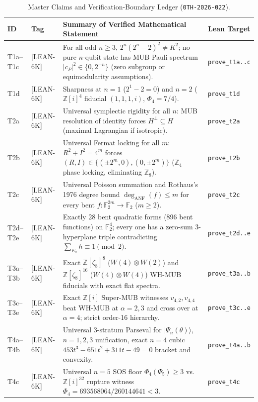 \documentclass[11pt,reqno]{amsart}
\theoremstyle{definition}
\newcommand{\F}{\mathbb{F}}
\newcommand{\Z}{\mathbb{Z}}
\newcommand{\taglean}{\textsf{[LEAN-6K]}}
\begin{document}
\begin{table}[htbp]
\centering
\caption{Master Claims and Verification-Boundary Ledger (\texttt{0TH-2026-022}).}
\label{tab:claims}
\small
\begin{tabularx}{\textwidth}{@{}l l L l@{}}
\toprule
\textbf{ID} & \textbf{Tag} & \textbf{Summary of Verified Mathematical Statement} & \textbf{Lean Target} \\
\midrule
T1a--T1c & \taglean & For all odd $n\ge 3$, $2^n(2^n-2)^2\neq K^2$; no pure $n$-qubit state has MUB Pauli spectrum $|c_P|^2\in\{0,2^{-n}\}$ (zero subgroup or equimodularity assumptions). & \texttt{prove\_t1a..c} \\
T1d & \taglean & Sharpness at $n=1$ ($2^1-2=0$) and $n=2$ ($\Z[i]^4$ fiducial $(1,1,1,i)$, $\Phi_4=7/4$). & \texttt{prove\_t1d} \\
T2a & \taglean & Universal symplectic rigidity for all $n$: MUB resolution of identity forces $H^\perp\subseteq H$ (maximal Lagrangian if isotropic). & \texttt{prove\_t2a} \\
T2b & \taglean & Universal Fermat locking for all $m$: $R^2+I^2=4^m$ forces $(R,I)\in\{(\pm 2^m,0),(0,\pm 2^m)\}$ ($\Z_4$ phase locking, eliminating $\Z_8$). & \texttt{prove\_t2b} \\
T2c & \taglean & Universal Poisson summation and Rothaus's 1976 degree bound $\deg_{\mathrm{ANF}}(f)\le m$ for every bent $f:\F_2^{2m}\to\F_2$ ($m\ge 2$). & \texttt{prove\_t2c} \\
T2d--T2e & \taglean & Exactly 28 bent quadratic forms (896 bent functions) on $\F_2^4$; every one has a zero-sum 3-hyperplane triple contradicting $\sum_{E_a}h\equiv 1\pmod 2$. & \texttt{prove\_t2d..e} \\
T3a--T3b & \taglean & Exact $\Z[\zeta_8]^8$ ($W(4)\otimes W(2)$) and $\Z[\zeta_8]^{16}$ ($W(4)\otimes W(4)$) WH-MUB fiducials with exact flat spectra. & \texttt{prove\_t3a..b} \\
T3c--T3e & \taglean & Exact $\Z[i]$ Super-MUB witnesses $v_{4,2},v_{4,4}$ beat WH-MUB at $\alpha=2,3$ and cross over at $\alpha=4$; strict order-16 hierarchy. & \texttt{prove\_t3c..e} \\
T4a--T4b & \taglean & Universal 3-stratum Parseval for $|\Psi_n(\theta)\rangle$, $n=1,2,3$ unification, exact $n=4$ cubic $453t^3-651t^2+311t-49=0$ bracket and convexity. & \texttt{prove\_t4a..b} \\
T4c & \taglean & Universal $n=5$ SOS floor $\Phi_4(\Psi_5)\ge 3$ vs.\ $\Z[i]^{32}$ rupture witness $\Phi_4=693568064/260144641<3$. & \texttt{prove\_t4c} \\

\end{tabularx}
\end{table}
\end{document}
